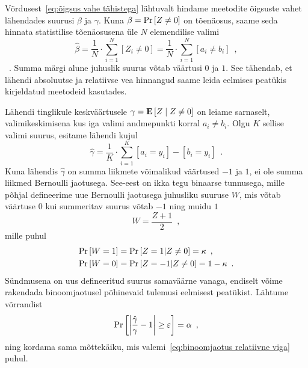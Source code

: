 Võrdusest~\eqref{eq:õigsus vahe tähistega} lähtuvalt hindame meetodite õigsuste vahet lähendades suurusi $\beta$ ja $\gamma$. Kuna $\beta = \Pr\left[Z \neq 0\right]$ on tõenäosus, saame seda hinnata statistilise tõenäosusena üle $N$ elemendilise valimi 
\begin{equation}
    \label{eq:beta lähend}
    \hat{\beta} = \frac{1}{N} \cdot \sum_{i = 1}^{N} [Z_i \neq 0] = \frac{1}{N} \cdot \sum_{i = 1}^{N} [a_i \neq b_i] \enspace,
\end{equation}~\cite{rakendusstatisika-algkursus}.
Summa märgi alune juhuslik suurus võtab väärtusi $0$ ja $1$. See tähendab, et lähendi absoluutse ja relatiivse vea hinnangud saame leida eelmises peatükis kirjeldatud meetodeid kasutades.

Lähendi tinglikule keskväärtusele $\gamma = \operatorname*{\mathbf{E}}\left[Z \mid Z \neq 0\right]$ on leiame sarnaselt, valimikeskimisena kus iga valimi andmepunkti korral $a_i \neq b_i$. Olgu $K$ sellise valimi suurus, esitame lähendi kujul
\begin{equation}
    \label{eq:gamma lähend}
    \hat{\gamma} = \frac{1}{K} \cdot \sum_{i = 1}^K [a_i = y_i] - [b_i = y_i] \enspace.
\end{equation}
Kuna lähendis $\hat{\gamma}$ on summa liikmete võimalikud väärtused $-1$ ja $1$, ei ole summa liikmed Bernoulli jaotusega. See-eest on ikka tegu binaarse tunnusega, mille põhjal defineerime uue Bernoulli jaotusega juhusliku suuruse $W$, mis võtab väärtuse $0$ kui summeritav suurus võtab $-1$ ning muidu $1$
\begin{equation*}
    W = \frac{Z + 1}{2} \enspace,
\end{equation*}
mille puhul
\begin{align*}
    \Pr\left[W = 1\right] &= \Pr\left[Z = 1 | Z \neq 0\right] = \kappa \enspace, \\
    \Pr\left[W = 0\right] &= \Pr\left[Z = -1 | Z \neq 0\right] = 1 - \kappa \enspace.
\end{align*}
Sündmusena on uus defineeritud suurus samaväärne vanaga, endiselt võime rakendada binoomjaotusel põhinevaid tulemusi eelmisest peatükist. Lähtume võrrandist
\begin{equation*}
    \Pr\left[\left| \frac{\hat{\gamma}}{\gamma} - 1 \right| \geq \varepsilon\right] = \alpha \enspace,
\end{equation*}
ning kordama sama mõttekäiku, mis valemi~\eqref{eq:binoomjaotus relatiivne viga} puhul.

